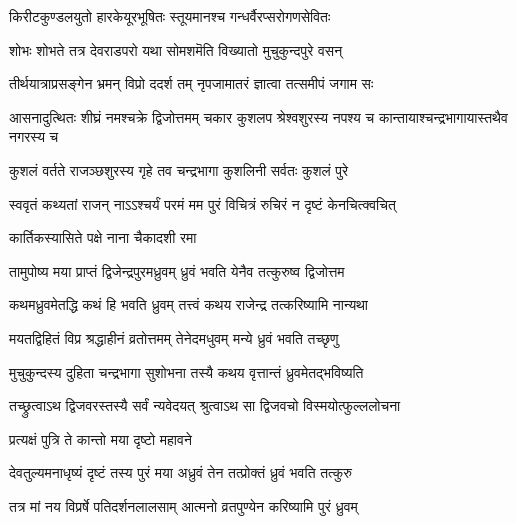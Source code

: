 \twolineshloka
{किरीटकुण्डलयुतो हारकेयूरभूषितः}
{स्तूयमानश्च गन्धर्वैरप्सरोगणसेवितः} %

\twolineshloka
{शोभः शोभते तत्र देवराडपरो यथा}
{सोमशमॆति विख्यातो मुचुकुन्दपुरे वसन्} %

\twolineshloka
{तीर्थयात्राप्रसङ्गेन भ्रमन् विप्रो ददर्श तम्}
{नृपजामातरं ज्ञात्वा तत्समीपं जगाम सः} %


\threelineshloka
{आसनादुत्थितः शीघ्रं नमश्चक्रे द्विजोत्तमम्}
{चकार कुशलप श्रेश्वशुरस्य नपश्य च}
{कान्तायाश्चन्द्रभागायास्तथैव नगरस्य च} %


\twolineshloka
{कुशलं वर्तते राजञ्छशुरस्य गृहे तव}
{चन्द्रभागा कुशलिनी सर्वतः कुशलं पुरे} %

\twolineshloka
{स्ववृतं कथ्यतां राजन् नाऽऽश्चर्यं परमं मम}
{पुरं विचित्रं रुचिरं न दृष्टं केनचित्क्वचित्} %



\onelineshloka
{कार्तिकस्यासिते पक्षे नाना चैकादशी रमा} %

\twolineshloka
{तामुपोष्य मया प्राप्तं द्विजेन्द्रपुरमध्रुवम्}
{ध्रुवं भवति येनैव तत्कुरुष्व द्विजोत्तम} %


\twolineshloka
{कथमध्रुवमेतद्धि कथं हि भवति ध्रुवम्}
{तत्त्वं कथय राजेन्द्र तत्करिष्यामि नान्यथा} %


\twolineshloka
{मयतद्विहितं विप्र श्रद्धाहीनं व्रतोत्तमम्}
{तेनेदमधुवम् मन्ये ध्रुवं भवति तच्छृणु} %

\twolineshloka
{मुचुकुन्दस्य दुहिता चन्द्रभागा सुशोभना}
{तस्यै कथय वृत्तान्तं ध्रुवमेतद्भविष्यति} %

\twolineshloka
{तच्छ्रुत्वाऽथ द्विजवरस्तस्यै सर्वं न्यवेदयत्}
{श्रुत्वाऽथ सा द्विजवचो विस्मयोत्फुल्ललोचना} %



\onelineshloka
{प्रत्यक्षं पुत्रि ते कान्तो मया दृष्टो महावने} %

\twolineshloka
{देवतुल्यमनाधृष्यं दृष्टं तस्य पुरं मया}
{अध्रुवं तेन तत्प्रोक्तं ध्रुवं भवति तत्कुरु} %


\twolineshloka
{तत्र मां नय विप्रर्षे पतिदर्शनलालसाम्}
{आत्मनो व्रतपुण्येन करिष्यामि पुरं ध्रुवम्} %

